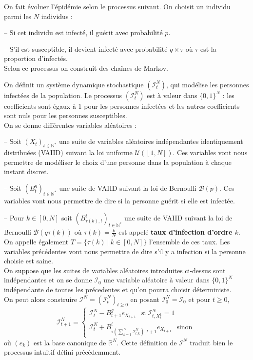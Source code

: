\documentclass[a4paper,10.9pt]{article}
\begin{document}
On fait évoluer l'épidémie selon le processus suivant. On choisit un individu parmi les $N$ individus :

-- Si cet individu est infecté, il guérit avec probabilité $p$.

-- S'il est susceptible, il devient infecté avec probabilité $q \times \tau$ où $\tau$ est la proportion d'infectés. \\

Selon ce processus on construit des chaînes de Markov.

On définit un système dynamique stochastique $(\mathcal{I}_t^N)$, qui modélise les personnes infectées de la population. Le processus $(\mathcal{I}_t^N)$ est à valeur dans $\{0,1\}^N$ : les coefficients sont égaux à $1$ pour les personnes infectées et les autres coefficients sont nuls pour les personnes susceptibles. \\

On se donne différentes variables aléatoires :

-- Soit $(X_t)_{t \in \mathbb{N}^*}$ une suite de variables aléatoires indépendantes identiquement distribuées (VAIID) suivant la loi uniforme $\mathcal{U}([1,N])$. Ces variables vont nous permettre de modéliser le choix d'une personne dans la population à chaque instant discret.

-- Soit $(B^g_t)_{t \in \mathbb{N}^*}$ une suite de VAIID suivant la loi de Bernoulli $\mathcal{B}(p)$. Ces variables vont nous permettre de dire si la personne guérit si elle est infectée.

-- Pour $k \in [0,N]$ soit $(B^i_{\tau(k),t})_{t \in \mathbb{N}^*}$ une suite de VAIID suivant la loi de Bernoulli $\mathcal{B}(q \tau(k))$ où $\tau(k)=\frac{k}{N}$ est appelé \textbf{taux d'infection d'ordre $k$}. On appelle également $T=\{\tau(k) \ | \ k \in [0,N]\}$ l'ensemble de ces taux. Les variables précédentes vont nous permettre de dire s'il y a infection si la personne choisie est saine. \\

On suppose que les suites de variables aléatoires introduites ci-dessus sont indépendantes et on se donne $\mathcal{I}_0$ une variable aléatoire à valeur dans $\{0,1\}^N$ indépendante de toutes les précedentes et qu'on pourra choisir déterministe. \\

On peut alors construire $\mathcal{I}^N=(\mathcal{I}^N_t)_{t \geq 0}$ en posant $\mathcal{I}^N_0=\mathcal{I}_0$ et pour $t \geq 0$,
$$\boxed{ \mathcal{I}_{t+1}^N = \left\{
\begin{array}{ll}
        \mathcal{I}_t^N-B_{t+1}^g e_{X_{t+1}} \ \ \operatorname{si} \mathcal{I}^N_{t,X^1_t}=1 \\
        \mathcal{I}_t^N+B_{\tau \left(\sum_{k=1}^N \mathcal{I}_{t,k}^N \right),t+1}^i e_{X_{t+1}} \ \ \operatorname{sinon}
\end{array}
\right. }$$
où $(e_k)$ est la base canonique de $\mathbb{R}^N$. Cette définition de $\mathcal{I}^N$ traduit bien le processus intuitif défini précédemment. \\
\end{document}
